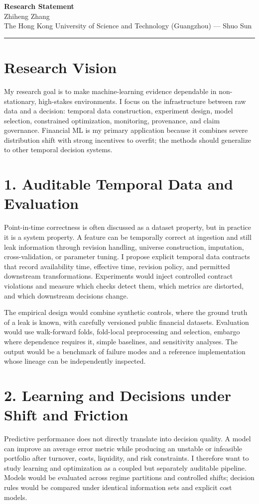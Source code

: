 \documentclass[11pt]{article}
\newcommand{\ApplicantName}{Zhiheng Zhang}
\begin{document}
\begin{center}
{\LARGE\bfseries Research Statement}\\[0.25em]
{\large \ApplicantName}\\
The Hong Kong University of Science and Technology (Guangzhou) --- Shuo Sun
\end{center}
\vspace{0.35em}\hrule\vspace{0.65em}

\section*{Research Vision}
My research goal is to make machine-learning evidence dependable in non-stationary, high-stakes environments. I focus on the infrastructure between raw data and a decision: temporal data construction, experiment design, model selection, constrained optimization, monitoring, provenance, and claim governance. Financial ML is my primary application because it combines severe distribution shift with strong incentives to overfit; the methods should generalize to other temporal decision systems.

\section*{1. Auditable Temporal Data and Evaluation}
Point-in-time correctness is often discussed as a dataset property, but in practice it is a system property. A feature can be temporally correct at ingestion and still leak information through revision handling, universe construction, imputation, cross-validation, or parameter tuning. I propose explicit temporal data contracts that record availability time, effective time, revision policy, and permitted downstream transformations. Experiments would inject controlled contract violations and measure which checks detect them, which metrics are distorted, and which downstream decisions change.

The empirical design would combine synthetic controls, where the ground truth of a leak is known, with carefully versioned public financial datasets. Evaluation would use walk-forward folds, fold-local preprocessing and selection, embargo where dependence requires it, simple baselines, and sensitivity analyses. The output would be a benchmark of failure modes and a reference implementation whose lineage can be independently inspected.

\section*{2. Learning and Decisions under Shift and Friction}
Predictive performance does not directly translate into decision quality. A model can improve an average error metric while producing an unstable or infeasible portfolio after turnover, costs, liquidity, and risk constraints. I therefore want to study learning and optimization as a coupled but separately auditable pipeline. Models would be evaluated across regime partitions and controlled shifts; decision rules would be compared under identical information sets and explicit cost models.
\end{document}
